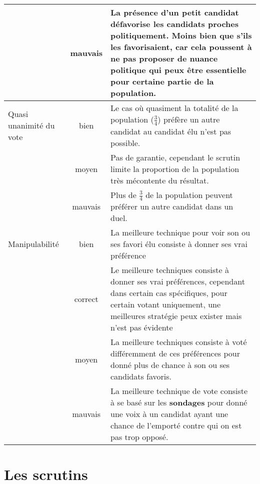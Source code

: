 \documentclass[../report]{subfiles}
\begin{document}
\begin{table}
\begin{center}
\begin{tabular}{p{8em}|c|p{28em}}
      \cline{2-3}
                       & \cellcolor{red}mauvais &  La présence d'un petit candidat \textbf{défavorise} les candidats proches politiquement. Moins bien que s'ils les favorisaient, car cela poussent à ne pas proposer de nuance politique qui peux être essentielle pour certaine partie de la population. \\
      \hline
      Quasi unanimité du vote  & \cellcolor{green}bien & Le cas où quasiment la totalité de la population ($\frac{3}{4}$) préfère un autre candidat au candidat élu n'est pas possible. \\
      \cline{2-3}
                       & \cellcolor{orange}moyen & Pas de garantie, cependant le scrutin limite la proportion de la population très mécontente du résultat. \\
      \cline{2-3}
                       & \cellcolor{red}mauvais & Plus de $\frac{3}{4}$ de la population peuvent préférer un autre candidat dans un duel. \\
      \hline
      Manipulabilité & \cellcolor{green}bien & La meilleure technique pour voir son ou ses favori élu consiste à donner ses vrai préférence \\
      \cline{2-3}
                     & \cellcolor{green!25!yellow}correct & Le meilleure techniques consiste à donner ses vrai préférences, cependant dans certain cas spécifiques,  pour certain votant uniquement, une meilleures stratégie peux exister mais n'est pas évidente \\
      \cline{2-3}
                     & \cellcolor{orange}moyen & La meilleure techniques consiste à voté différemment de ces préférences pour donné plus de chance à son ou ses candidats favoris. \\
      \cline{2-3}
                     & \cellcolor{red}mauvais & La meilleure technique de vote consiste à se basé sur les \textbf{sondages} pour donné une voix à un candidat ayant une chance de l'emporté contre qui on est pas trop opposé. \\
      \hline
    \end{tabular}
  \end{center}
  \end{table}

  \chapter{Les scrutins}
\end{document}
